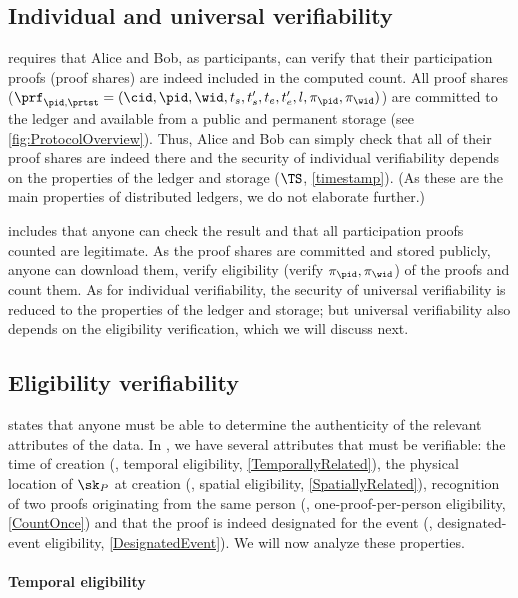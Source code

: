 \subsection{Individual and universal verifiability}%
\label{analysis-individual}%
\label{analysis-universal}

 requires that Alice and Bob, as participants, can verify 
that their participation proofs (\ie proof shares) are indeed included in the 
computed count.
All proof shares (\ie \(\prf_{\pid, \prtst} = (\cid, \pid, \wid, t_s, t_s', 
  t_e, t_e', l, \pi_\pid, \pi_{\wid})\)) are committed to the ledger and 
available from a public and permanent storage (see 
\cref{fig:ProtocolOverview}).
Thus, Alice and Bob can simply check that all of their proof shares are indeed 
there and the security of individual verifiability depends on the properties of 
the ledger and storage (\(\TS\), \cref{timestamp}).
(As these are the main properties of distributed ledgers, we do not elaborate 
further.)

 includes that anyone can check the result and that all 
participation proofs counted are legitimate.
As the proof shares are committed and stored publicly, anyone can
download them, verify eligibility (\ie verify \(\pi_\pid,
\pi_{\wid}\)) of the proofs and count them.
As for individual verifiability, the security of universal verifiability is 
reduced to the properties of the ledger and storage; but universal 
verifiability also depends on the eligibility verification, which we will 
discuss next.

\subsection{Eligibility verifiability}%
\label{analysis-eligibility}

 states that anyone must be able to determine the authenticity of the relevant attributes of the data.
In \PRIVO, we have several attributes that must be verifiable: the time of 
creation (\ie, temporal eligibility, \cref{TemporallyRelated}), the physical 
location of \(\sk_P\) at creation (\ie, spatial eligibility, 
\cref{SpatiallyRelated}), recognition of two proofs originating from the same 
person (\ie, one-proof-per-person eligibility, \cref{CountOnce}) and that the 
proof is indeed designated for the event (\ie, designated-event eligibility, 
\cref{DesignatedEvent}).
We will now analyze these properties.

\paragraph{Temporal eligibility}%
\label{analysis-temporal}

